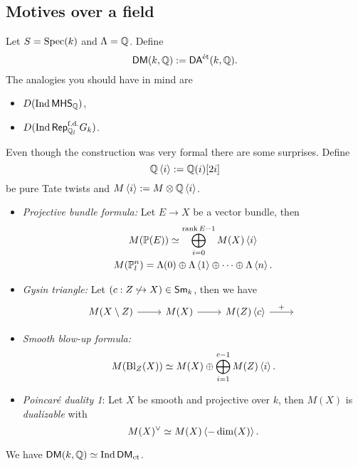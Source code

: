 \subsection{Motives over a field}
Let $S=\operatorname{Spec}(k)$ and $\Lambda=\mathbb Q$. Define
\[
	\mathsf{DM}(k,\mathbb Q) := \mathsf{DA}^\text{\'et}(k,\mathbb Q).
\] 
The analogies you should have in mind are
\begin{itemize}
	\item $D(\operatorname{Ind} \mathsf{MHS}_{\mathbb Q})$,
	\item $D(\operatorname{Ind} \mathsf{Rep}_{\mathbb Q_l}^{\text{f.d.}}G_k)$.
\end{itemize}
Even though the construction was very formal there are some surprises. Define
\[
	\mathbb Q\left<i \right> := \mathbb Q(i)[2i]
\] 
be pure Tate twists and $M\left<i \right>:= M\otimes \mathbb Q\left<i \right>$.
\begin{itemize}
	\item \emph{Projective bundle formula:} Let $E\to X$ be a vector bundle, then
		\begin{gather*}
			M(\mathbb{P}(E)) \simeq \bigoplus_{i=0}^{\operatorname{rank} E-1}M(X)\left<i \right> \\
			M(\mathbb{P}^{n}_l) = \Lambda(0)\oplus \Lambda\left<1 \right>\oplus \dots\oplus \Lambda\left<n \right>.
		\end{gather*}
	\item \emph{Gysin triangle:} Let $(c:Z\not\hookrightarrow X)\in \mathsf{Sm}_k$, then we have
		\[
		\begin{tikzcd}
			M(X\setminus Z) \ar[r] & M(X) \ar[r] & M(Z)\left<c \right> \ar[r,"+"] & { }
		\end{tikzcd}
		\] 
	\item \emph{Smooth blow-up formula:}
		\[
		M(\operatorname{Bl}_Z(X)) \simeq M(X)\oplus \bigoplus_{i=1}^{c-1}M(Z)\left<i \right>.
		\] 
	\item \emph{Poincar\'e duality 1}: Let $X$ be smooth and projective over $k$, then $M(X)$ is \emph{dualizable} with
		\[
		M(X)^{\vee}\simeq M(X)\left<-\dim(X) \right>.
		\] 
\end{itemize}
We have $\mathsf{DM}(k,\mathbb Q)\simeq \operatorname{Ind}\mathsf{DM}_{\text{ct}}$.



